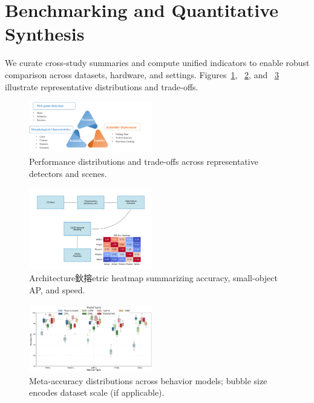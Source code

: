 \documentclass[a4paper,fleqn]{cas-dc}
\begin{document}
\section{Benchmarking and Quantitative Synthesis}
We curate cross-study summaries and compute unified indicators to enable robust comparison across datasets, hardware, and settings. Figures~\ref{fig:box_accuracy}, ~\ref{fig:heatmap_tradeoff}, and ~\ref{fig:bubble_execution} illustrate representative distributions and trade-offs.

\begin{figure}[h]
  \centering
  \includegraphics[width=0.48\textwidth]{fig_performance.png}
  \caption{Performance distributions and trade-offs across representative detectors and scenes.}
  \label{fig:box_accuracy}
\end{figure}

\begin{figure}[h]
  \centering
  \includegraphics[width=0.48\textwidth]{7.dl_architecture_heatmap_embedded.pdf}
  \caption{Architecture鈥搈etric heatmap summarizing accuracy, small-object AP, and speed.}
  \label{fig:heatmap_tradeoff}
\end{figure}

\begin{figure}[h]
  \centering
  \includegraphics[width=0.48\textwidth]{9.box_meta_accuracy_behavior_model.pdf}
  \caption{Meta-accuracy distributions across behavior models; bubble size encodes dataset scale (if applicable).}
  \label{fig:bubble_execution}
\end{figure}
\end{document}
